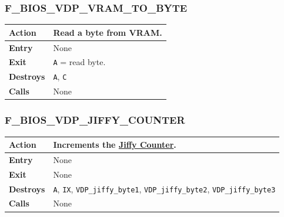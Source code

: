 \documentclass[a4paper,11pt]{article}
\begin{document}
        \subsubsection{F\_BIOS\_VDP\_VRAM\_TO\_BYTE}
        \label{func:fbiosvdpvramtobyte}
        \begin{tabular}{l p{9cm}}
            \hline\textbf{Action}
            & Read a byte from \textbf{VRAM}.\\
            \hline\textbf{Entry} & None\\
            \hline\textbf{Exit} & \texttt{A} = read byte.\\
            \hline\textbf{Destroys} & \texttt{A}, \texttt{C} \\
            \hline\textbf{Calls} & None\\
            \hline
        \end{tabular}

        \subsubsection{F\_BIOS\_VDP\_JIFFY\_COUNTER}
        \label{func:fbiosvdpjiffycounter}
        \begin{tabular}{l p{9cm}}
            \hline\textbf{Action}
            & Increments the \hyperref[subsec:jiffy_counter]{Jiffy Counter}.\\
            \hline\textbf{Entry} & None\\
            \hline\textbf{Exit} & None\\
            \hline\textbf{Destroys} & \texttt{A}, \texttt{IX},
            \texttt{VDP\_jiffy\_byte1}, \texttt{VDP\_jiffy\_byte2},
            \texttt{VDP\_jiffy\_byte3}\\
            \hline\textbf{Calls} & None\\
            \hline
        \end{tabular}

\end{document}
